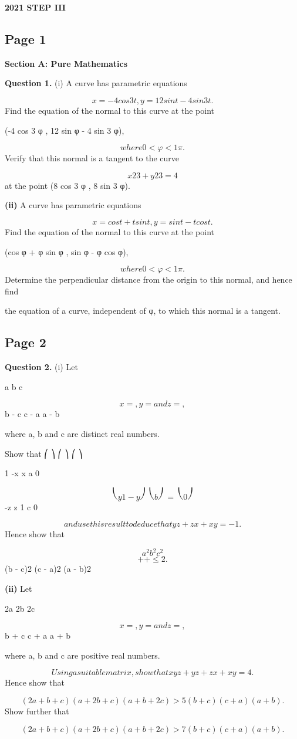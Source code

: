 \documentclass[12pt]{article}
\begin{document}
\begin{center}
{\Large \textbf{2021 STEP III}}
\end{center}

\subsection*{Page 1}
\begin{flushleft}
\bigskip\textbf{Section A: Pure Mathematics}\par
\bigskip\textbf{Question 1.} (i) A curve has parametric equations\par
\[x = -4 cos 3 t , y = 12 sin t - 4 sin 3 t .\]
Find the equation of the normal to this curve at the point\par
(-4 cos 3 φ , 12 sin φ - 4 sin 3 φ),\par
\[where 0 < φ < 1 \pi.\]
Verify that this normal is a tangent to the curve\par
\[x 2 3 + y 2 3 = 4\]
at the point (8 cos 3 φ , 8 sin 3 φ).\par
\textbf{(ii)} A curve has parametric equations\par
\[x = cos t + t sin t , y = sin t - t cos t.\]
Find the equation of the normal to this curve at the point\par
(cos φ + φ sin φ , sin φ - φ cos φ),\par
\[where 0 < φ < 1 \pi.\]
Determine the perpendicular distance from the origin to this normal, and hence find\par
the equation of a curve, independent of φ, to which this normal is a tangent.\par
\end{flushleft}
\subsection*{Page 2}
\begin{flushleft}
\bigskip\textbf{Question 2.} (i) Let\par
a b c\par
\[x = , y = and z = ,\]
b - c c - a a - b\par
where a, b and c are distinct real numbers.\par
Show that ⎛ ⎞ ⎛ ⎞ ⎛ ⎞\par
1 -x x a 0\par
\[⎝ y 1 -y ⎠ ⎝ b ⎠ = ⎝ 0 ⎠\]
-z z 1 c 0\par
\[and use this result to deduce that yz + zx + xy = -1 .\]
Hence show that\par
\[a^2 b^2 c^2\]
\[+ + \leq 2 .\]
(b - c)2 (c - a)2 (a - b)2\par
\textbf{(ii)} Let\par
2a 2b 2c\par
\[x = , y = and z = ,\]
b + c c + a a + b\par
where a, b and c are positive real numbers.\par
\[Using a suitable matrix, show that xyz + yz + zx + xy = 4 .\]
Hence show that\par
\[(2a + b + c)(a + 2b + c)(a + b + 2c) > 5(b + c)(c + a)(a + b) .\]
Show further that\par
\[(2a + b + c)(a + 2b + c)(a + b + 2c) > 7(b + c)(c + a)(a + b) .\]
\end{flushleft}
\end{document}
